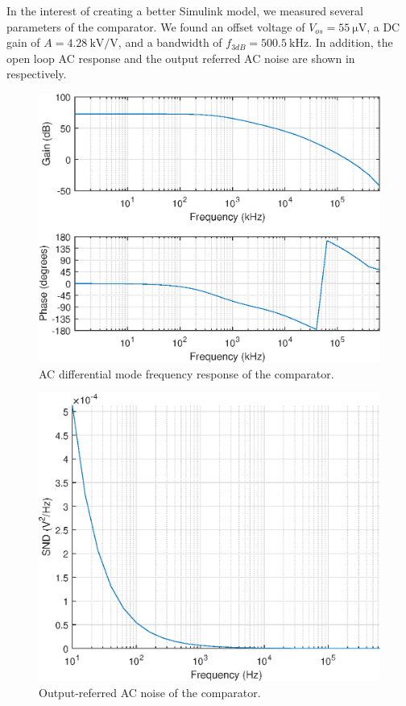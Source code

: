 \documentclass[journal,hidelinks]{IEEEtran}
\begin{document}
In the interest of creating a better Simulink model, we measured several parameters of the comparator. We found an offset voltage of $V_{os} = \SI{55}{\micro\volt}$, a DC gain of $A = \SI{4.28}{\kilo\volt\per\volt}$, and a bandwidth of $f_{3dB} = \SI{500.5}{\kilo\hertz}$. In addition, the open loop AC response and the output referred AC noise are shown in  respectively.

\begin{figure}[!htb]
  \centering
  \includegraphics[width=0.8\columnwidth]{circuit/comparator/ac_dm.eps}
  \caption{AC differential mode frequency response of the comparator.}
  \label{fig:comparator_ac_dm}
\end{figure}

\begin{figure}[!htb]
  \centering
  \includegraphics[width=0.8\columnwidth]{circuit/comparator/ac_noise.eps}
  \caption{Output-referred AC noise of the comparator.}
  \label{fig:comparator_ac_noise}
\end{figure}
\end{document}
